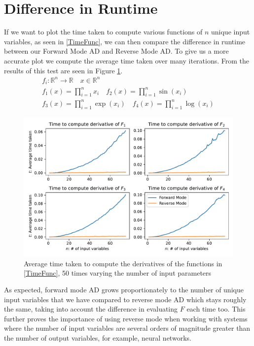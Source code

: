 \documentclass{article}
\begin{document}
\section{Difference in Runtime}

If we want to plot the time taken to compute various functions of $n$ unique input variables, as seen in \eqref{TimeFunc}, we can then compare the difference in runtime between our Forward Mode AD and Reverse Mode AD. To give us a more accurate plot we compute the average time taken over many iterations. From \cite{github} the results of this test are seen in Figure \ref{fig:TimeDiff}.
\begin{equation} \label{TimeFunc}
    \begin{gathered}
        f_i: \mathbb{R}^n \longrightarrow \mathbb{R} \quad x \in \mathbb{R}^n \\
        f_1(x) = \prod_{i=1}^n x_i  \quad f_2(x) = \prod_{i=1}^n \sin(x_i) \\
        f_3(x) = \prod_{i=1}^n \exp(x_i)  \quad f_4(x) = \prod_{i=1}^n \log(x_i)
    \end{gathered}
\end{equation}

\begin{figure}[h]
    \centering
    \includegraphics[width=15cm]{images/Graph_TimeDiff.pdf}
    \caption{Average time taken to compute the derivatives of the functions in \eqref{TimeFunc}, 50 times varying the number of input parameters}
    \label{fig:TimeDiff}
\end{figure}

As expected, forward mode AD grows proportionately to the number of unique input variables that we have compared to reverse mode AD which stays roughly the same, taking into account the difference in evaluating $F$ each time too. This further proves the importance of using reverse mode when working with systems where the number of input variables are several orders of magnitude greater than the number of output variables, for example, neural networks.
\end{document}
